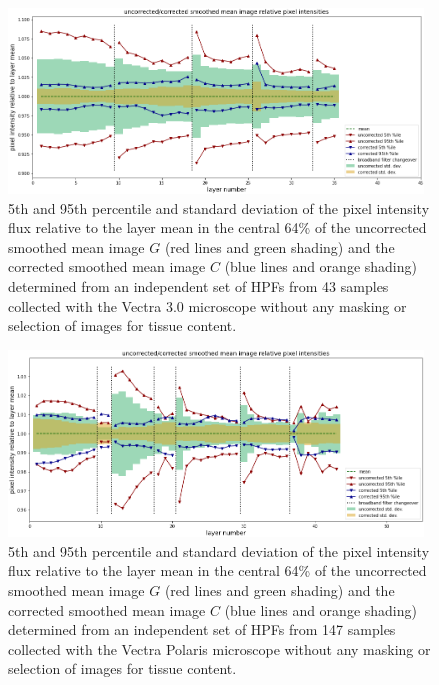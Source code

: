 \documentclass[letterpaper,11pt]{article}
\begin{document}
\begin{figure}[!ht]
\centering
\includegraphics[width=0.98\textwidth]{images/results/unmasked_flatfield_illumination_variation_reduction_vectra}
\caption{\footnotesize 5th and 95th percentile and standard deviation of the pixel intensity flux relative to the layer mean in the central 64\% of the uncorrected smoothed mean image $G$ (red lines and green shading) and the corrected smoothed mean image $C$ (blue lines and orange shading) determined from an independent set of HPFs from 43 samples collected with the Vectra 3.0 microscope without any masking or selection of images for tissue content.}
\label{fig:unmasked_illumination_variation_reduction_vectra}
\end{figure} 

\begin{figure}[!ht]
\centering
\includegraphics[width=0.98\textwidth]{images/results/unmasked_flatfield_illumination_variation_reduction_polaris}
\caption{\footnotesize 5th and 95th percentile and standard deviation of the pixel intensity flux relative to the layer mean in the central 64\% of the uncorrected smoothed mean image $G$ (red lines and green shading) and the corrected smoothed mean image $C$ (blue lines and orange shading) determined from an independent set of HPFs from 147 samples collected with the Vectra Polaris microscope without any masking or selection of images for tissue content.}
\label{fig:unmasked_illumination_variation_reduction_polaris}
\end{figure} 
\end{document}
